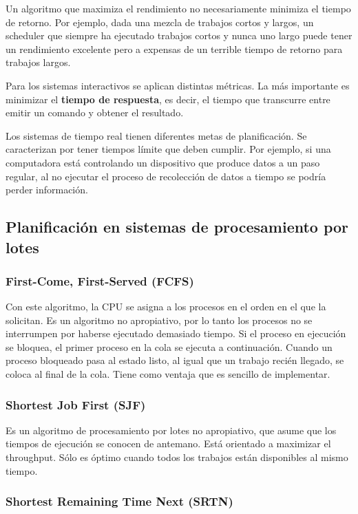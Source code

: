 Un algoritmo que maximiza el rendimiento no necesariamente minimiza el tiempo de retorno. Por ejemplo, dada una mezcla de trabajos cortos y largos, un scheduler que siempre ha ejecutado trabajos cortos y nunca uno largo puede tener un rendimiento excelente pero a expensas de un terrible tiempo de retorno para trabajos largos.

Para los sistemas interactivos se aplican distintas métricas. La más importante es minimizar el \textbf{tiempo de respuesta}, es decir, el tiempo que transcurre entre emitir un comando y obtener el resultado.

Los sistemas de tiempo real tienen diferentes metas de planificación. Se caracterizan por tener tiempos límite que deben cumplir. Por ejemplo, si una computadora está controlando un dispositivo que produce datos a un paso regular, al no ejecutar el proceso de recolección de datos a tiempo se podría perder información.

\subsection{Planificación en sistemas de procesamiento por lotes}

\subsubsection{First-Come, First-Served (FCFS)}

Con este algoritmo, la CPU se asigna a los procesos en el orden en el que la solicitan. Es un algoritmo no apropiativo, por lo tanto los procesos no se interrumpen por haberse ejecutado demasiado tiempo. Si el proceso en ejecución se bloquea, el primer proceso en la cola se ejecuta a continuación. Cuando un proceso bloqueado pasa al estado listo, al igual que un trabajo recién llegado, se coloca al final de la cola. Tiene como ventaja que es sencillo de implementar.

\subsubsection{Shortest Job First (SJF)}

Es un algoritmo de procesamiento por lotes no apropiativo, que asume que los tiempos de ejecución se conocen de antemano. Está orientado a maximizar el throughput. Sólo es óptimo cuando todos los trabajos están disponibles al mismo tiempo.

\subsubsection{Shortest Remaining Time Next (SRTN)}


